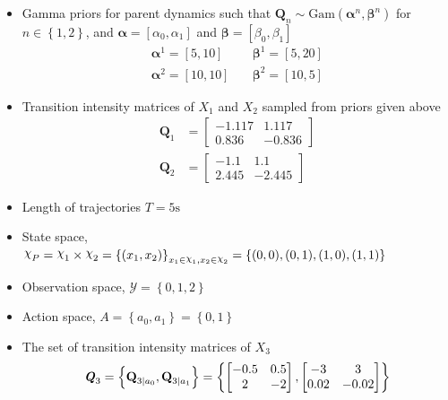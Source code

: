 \begin{itemize}
	\item Gamma priors for parent dynamics such that $ \textbf{Q}_{n} \sim \mathrm{Gam}(\symbf{\alpha}^n, \symbf{\beta}^n)$ for $n \in \left\lbrace 1,2\right\rbrace $, and $ \symbf{\alpha} = [\alpha_0, \alpha_1] $ and $ \symbf{\beta} = [\beta_0, \beta_1] $
	\begin{align}
	\symbf{\alpha}^1 = [5,10] &\quad \symbf{\beta}^1 = [5,20] \\
	\symbf{\alpha}^2 = [10,10] &\quad \symbf{\beta}^2 = [10,5]
	\label{eq:gamma_params}
	\end{align}
	\item Transition intensity matrices of $ X_1 $ and $ X_2 $ sampled from priors given above
	\begin{align}
	\textbf{Q}_1 &= 
	\begin{bmatrix}
	-1.117 & 1.117 \\
	0.836 &  -0.836
	\end{bmatrix} \\
	\textbf{Q}_2 &= 
	\begin{bmatrix}
	-1.1 & 1.1 \\
	2.445 &  -2.445
	\end{bmatrix}
	\end{align}
	\item Length of trajectories $ T = 5\text{s} $
	\item State space, $ \rchi_{P} = \rchi_1 \times \rchi_2 = \left\lbrace (x_1, x_2)\right\rbrace_{x_1\in \rchi_1, x_2\in \rchi_2} = \left\lbrace (0, 0), (0, 1), (1, 0),(1, 1)\right\rbrace $
	\item Observation space, $ \mathcal{Y} = \left\lbrace 0, 1, 2 \right\rbrace $
	\item Action space, $ \textit{A} = \left\lbrace a_{0}, a_{1} \right\rbrace = \left\lbrace 0, 1\right\rbrace $
	\item The set of transition intensity matrices of $ X_3 $
	\begin{align}
	\textbf{\textit{Q}}_3 = \left\lbrace \textbf{Q}_{3\mid a_{0}}, \textbf{Q}_{3\mid a_{1}} \right\rbrace = \left\lbrace 
	\begin{bmatrix}
	-0.5 & 0.5 \\
	2 &  -2
	\end{bmatrix}, 
	\begin{bmatrix}
	-3 & 3 \\
	0.02 &  -0.02
	\end{bmatrix} 
	\right\rbrace 
	\end{align}

\end{itemize}

